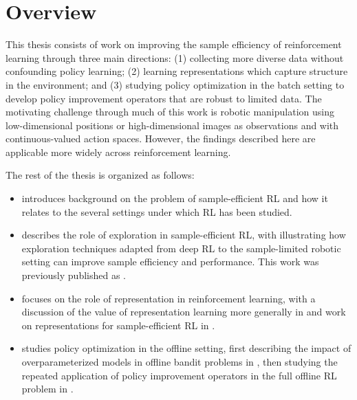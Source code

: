 \section{Overview}

This thesis consists of work on improving the sample efficiency of reinforcement learning through three main directions: (1) collecting more diverse data without confounding policy learning; (2) learning representations which capture structure in the environment; and (3) studying policy optimization in the batch setting to develop policy improvement operators that are robust to limited data.
The motivating challenge through much of this work is robotic manipulation using low-dimensional positions or high-dimensional images as observations and with continuous-valued action spaces.
However, the findings described here are applicable more widely across reinforcement learning.

The rest of the thesis is organized as follows:
\begin{itemize}
    \item {} introduces background on the problem of sample-efficient RL and how it relates to the several settings under which RL has been studied.
    \item {} describes the role of exploration in sample-efficient RL, with  illustrating how exploration techniques adapted from deep RL to the sample-limited robotic setting can improve sample efficiency and performance. This work was previously published as \citet{whitney2021decoupled}.
    \item {} focuses on the role of representation in reinforcement learning, with a discussion of the value of representation learning more generally in  \citep{whitney2021evaluating} and work on representations for sample-efficient RL in  \citep{Whitney2020Dynamics-Aware}.
    \item {} studies policy optimization in the offline setting, first describing the impact of overparameterized models in offline bandit problems in  \citep{brandfonbrener2021offlinecontextual}, then studying the repeated application of policy improvement operators in the full offline RL problem in  \citep{brandfonbrener2021offlinerl}.
\end{itemize}









\printendnotes
